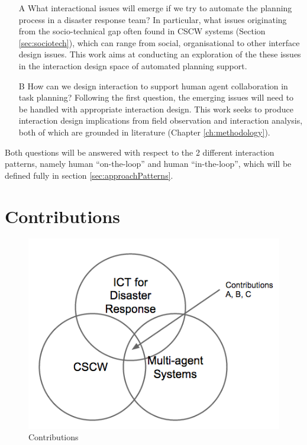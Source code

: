 \begin{enumerate}
\item[A] What interactional issues will emerge if we try to automate the planning process in a disaster response team? In particular, what issues originating from the socio-technical gap often found in \ac{CSCW} systems (Section \ref{sec:sociotech}), which can range from social, organisational to other interface design issues. This work aims at conducting an exploration of the these issues in the interaction design space of automated planning support.

\item[B] How can we design interaction to support human agent collaboration in task planning?
Following the first question, the emerging issues will need to be handled with appropriate interaction design. This work seeks to produce interaction design implications from field observation and interaction analysis, both of which are grounded in literature (Chapter \ref{ch:methodology}).
\end{enumerate}

Both questions will be answered with respect to the 2 different interaction patterns, namely human ``on-the-loop'' and human ``in-the-loop'', which will be defined fully in section \ref{sec:approachPatterns}. 

\section{Contributions} 
\begin{figure}[h]
  \centering
  \includegraphics[scale=0.5]{img/introduction/contributions.png}
  \caption{Contributions}
  \label{fig:contributions}
\end{figure}


